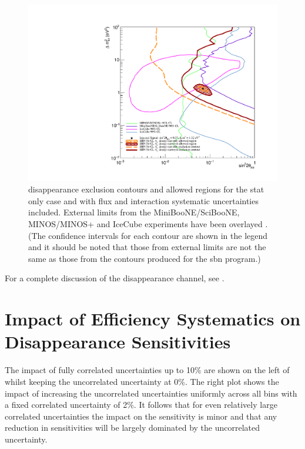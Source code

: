 \begin{figure}[h!]
    \centering
    \includegraphics[width = \largefigwidth]{figures-chap6/overlays/valor_overlays_numu_disapp.pdf}
    \caption[\numu disappearance contours with external limits.]{\numu disappearance exclusion contours and allowed regions for the stat only case and with flux and interaction systematic uncertainties included. External limits from the MiniBooNE/SciBooNE, MINOS/MINOS+ and IceCube experiments have been overlayed \cite{MiniBooNE/SciBooNE_numu_disapp_contour}\cite{MINOS_numu_disapp_contour}\cite{IceCube_numu_disapp_contour}. (The confidence intervals for each contour are shown in the legend and it should be noted that those from external limits are not the same as those from the contours produced for the \gls{sbn} program.)}
    \label{fig:numu_disapp_global_sensitivity}
\end{figure}

\newpage

For a complete discussion of the \numu disappearance channel, see \cite{Rhiannon's_thesis}.


\section*{\texorpdfstring{Impact of Efficiency Systematics on \numu Disappearance Sensitivities}{Impact of Efficiency Systematics on numu Disappearance Sensitivities}}


The impact of fully correlated uncertainties up to 10\% are shown on the left of  whilst keeping the uncorrelated uncertainty at 0\%. The right plot shows the impact of increasing the uncorrelated uncertainties uniformly across all bins with a fixed correlated uncertainty of 2\%. It follows that for even relatively large correlated uncertainties the impact on the sensitivity is minor and that any reduction in sensitivities will be largely dominated by the uncorrelated uncertainty. 

